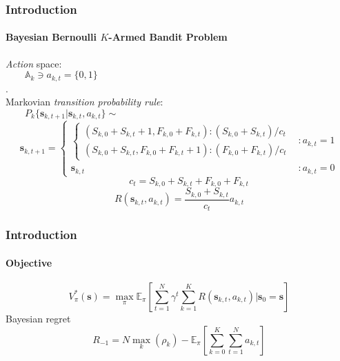 \documentclass[12pt,aspectratio=169, mathserif]{beamer}
\begin{document}
  \begin{frame}[t]
    \frametitle{Introduction}
    \framesubtitle{Bayesian Bernoulli $K$-Armed Bandit Problem}
    \textit{Action} space:\\
    $\qquad\mathbb{A}_k \ni a_{k,t} = \{0 , 1\}$\\
    \color{white}.\color{black}\\
    Markovian \textit{transition probability rule}:\\
    $\qquad P_k\{\mathbf{s}_{k, t + 1} | \mathbf{s}_{k, t}, a_{k, t}\}\sim$
    \begin{equation*}
      \mathbf{s}_{k, t + 1} = \left\{\begin{matrix}
        \left\{\begin{array}{c}
          (S_{k, 0} + S_{k, t} + 1, F_{k, 0} + F_{k, t}): (S_{k, 0} + S_{k, t})/c_t\\
          (S_{k, 0} + S_{k, t}, F_{k, 0} + F_{k, t} + 1): (F_{k, 0} + F_{k, t})/c_t
        \end{array}\right.&:a_{k,t} = 1\\
        \mathbf{s}_{k, t} &: a_{k, t} = 0
      \end{matrix}\right.
    \end{equation*}
    \begin{equation*}
      \qquad c_t = S_{k, 0} + S_{k, t} + F_{k, 0} + F_{k, t}
    \end{equation*}
    \begin{equation*}
      R(\mathbf{s}_{k, t}, a_{k, t}) = \frac{S_{k, 0} + S_{k, t}}{c_t}a_{k, t}
    \end{equation*}
  \end{frame}
  \begin{frame}[t]
    \frametitle{Introduction}
    \framesubtitle{Objective}
    \begin{equation*}
      V^*_\pi(\mathbf{s}) = \max_\pi\mathbb{E}_\pi\left[\sum_{t = 1}^N\gamma^t
      \sum_{k = 1}^KR(\mathbf{s}_{k,t}, a_{k,t})|\mathbf{s}_0 = \mathbf{s}\right]
    \end{equation*}
    Bayesian regret
    \begin{equation*}
      R_{-1} = N\max_k(\rho_k) - \mathbb{E}_\pi\left[\sum_{k = 0}^K\sum_{t = 1}^Na_{k,t}\right]
    \end{equation*}
  \end{frame}
\end{document}
